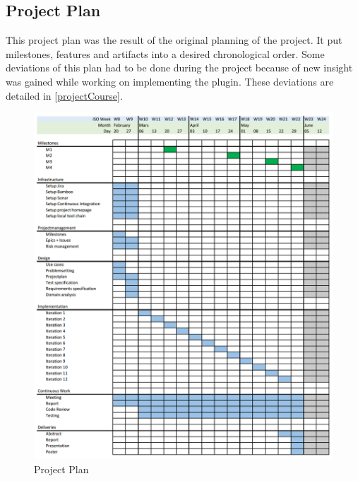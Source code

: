 \subsection{Project Plan}\label{projectplan}
This project plan was the result of the original planning of the project. It put milestones, features and artifacts into a desired chronological order. Some deviations of this plan had to be done during the project because of new insight was gained while working on implementing the plugin. These deviations are detailed in \ref{projectCourse}.
\begin{figure}[H]
	\centering
	\includegraphics[width=1\textwidth]{img/projectplan}
	\caption{Project Plan}
	\label{fig:Projectplan}
\end{figure}